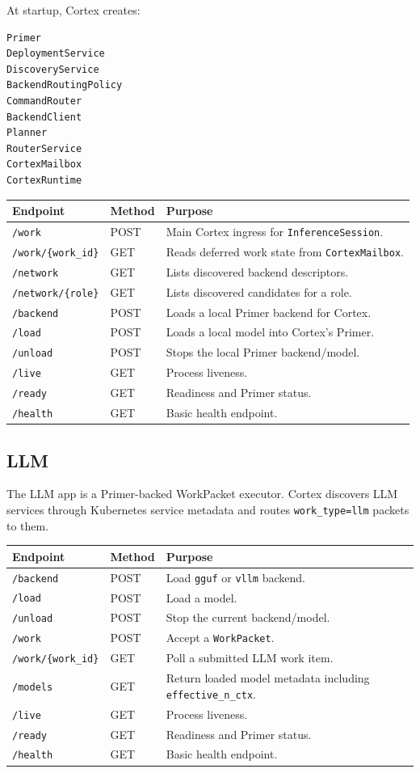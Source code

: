\documentclass[11pt,a4paper]{article}
\begin{document}
At startup, Cortex creates:
\begin{lstlisting}
Primer
DeploymentService
DiscoveryService
BackendRoutingPolicy
CommandRouter
BackendClient
Planner
RouterService
CortexMailbox
CortexRuntime
\end{lstlisting}

\begin{longtable}{@{}p{4cm}p{2cm}p{8cm}@{}}
\toprule
\textbf{Endpoint} & \textbf{Method} & \textbf{Purpose} \\
\midrule
\endhead
\texttt{/work} & POST & Main Cortex ingress for \texttt{InferenceSession}. \\
\texttt{/work/\{work\_id\}} & GET & Reads deferred work state from \texttt{CortexMailbox}. \\
\texttt{/network} & GET & Lists discovered backend descriptors. \\
\texttt{/network/\{role\}} & GET & Lists discovered candidates for a role. \\
\texttt{/backend} & POST & Loads a local Primer backend for Cortex. \\
\texttt{/load} & POST & Loads a local model into Cortex's Primer. \\
\texttt{/unload} & POST & Stops the local Primer backend/model. \\
\texttt{/live} & GET & Process liveness. \\
\texttt{/ready} & GET & Readiness and Primer status. \\
\texttt{/health} & GET & Basic health endpoint. \\
\bottomrule
\end{longtable}

\subsection{LLM}
The LLM app is a Primer-backed WorkPacket executor. Cortex discovers LLM services through Kubernetes service metadata and routes \texttt{work\_type=llm} packets to them.

\begin{longtable}{@{}p{4cm}p{2cm}p{8cm}@{}}
\toprule
\textbf{Endpoint} & \textbf{Method} & \textbf{Purpose} \\
\midrule
\endhead
\texttt{/backend} & POST & Load \texttt{gguf} or \texttt{vllm} backend. \\
\texttt{/load} & POST & Load a model. \\
\texttt{/unload} & POST & Stop the current backend/model. \\
\texttt{/work} & POST & Accept a \texttt{WorkPacket}. \\
\texttt{/work/\{work\_id\}} & GET & Poll a submitted LLM work item. \\
\texttt{/models} & GET & Return loaded model metadata including \texttt{effective\_n\_ctx}. \\
\texttt{/live} & GET & Process liveness. \\
\texttt{/ready} & GET & Readiness and Primer status. \\
\texttt{/health} & GET & Basic health endpoint. \\
\bottomrule
\end{longtable}
\end{document}
